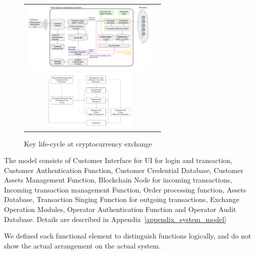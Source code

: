 \begin{figure}[htbp]
  \begin{tabular}{cc}
    \begin{minipage}{0.5\hsize}
      \begin{center}
        \includegraphics[width=6.5cm,pagebox=cropbox,clip]{system_model.pdf}
        \caption{System model of cryptocurrency exchange}
        \label{fig_system_model}
      \end{center}
    \end{minipage}
    \begin{minipage}{0.5\hsize}
      \begin{center}
        \includegraphics[width=4.5cm,pagebox=cropbox,clip]{key_lifecycle.pdf}
        \caption{Key life-cycle at cryptocurrency exchange}
        \label{key_lifecycle}
      \end{center}
    \end{minipage}
  \end{tabular}
\end{figure}


The model consists of Customer Interface for UI for login and transaction, Customer Authentication Function, Customer Credential Database, Customer Assets Management Function, Blockchain Node for incoming transactions, Incoming transaction management Function, Order processing function, Assets Database, Transaction Singing Function for outgoing transactions, Exchange Operation Modules, Operator Authentication Function and Operator Audit Database. Details are described in Appendix~\ref{appendix_system_model}

We defined each functional element to distinguish functions logically, and do not show the actual arrangement on the actual system.

